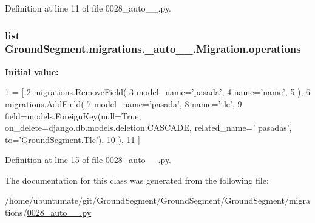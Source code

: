 Definition at line 11 of file 0028\+\_\+auto\+\_\+\_.\+py.

\hypertarget{class_ground_segment_1_1migrations_1_10028__auto__20170115__1524_1_1_migration_a1bc752acd28e76bac6c1e2b50b231fc9}{}
\subsubsection[{operations}]{\setlength{\rightskip}{0pt plus 5cm}list Ground\+Segment.\+migrations.\+\_\+auto\+\_\+\_.\+Migration.\+operations\hspace{0.3cm}{\ttfamily [static]}}\label{class_ground_segment_1_1migrations_1_10028__auto__20170115__1524_1_1_migration_a1bc752acd28e76bac6c1e2b50b231fc9}
{\bfseries Initial value\+:}
\begin{DoxyCode}
1 = [
2         migrations.RemoveField(
3             model\_name=\textcolor{stringliteral}{'pasada'},
4             name=\textcolor{stringliteral}{'name'},
5         ),
6         migrations.AddField(
7             model\_name=\textcolor{stringliteral}{'pasada'},
8             name=\textcolor{stringliteral}{'tle'},
9             field=models.ForeignKey(null=\textcolor{keyword}{True}, on\_delete=django.db.models.deletion.CASCADE, related\_name=\textcolor{stringliteral}{'
      pasadas'}, to=\textcolor{stringliteral}{'GroundSegment.Tle'}),
10         ),
11     ]
\end{DoxyCode}


Definition at line 15 of file 0028\+\_\+auto\+\_\+\_.\+py.



The documentation for this class was generated from the following file\+:\begin{DoxyCompactItemize}
\item 
/home/ubuntumate/git/\+Ground\+Segment/\+Ground\+Segment/\+Ground\+Segment/migrations/\hyperlink{0028__auto__20170115__1524_8py}{0028\+\_\+auto\+\_\+\_.\+py}\end{DoxyCompactItemize}
